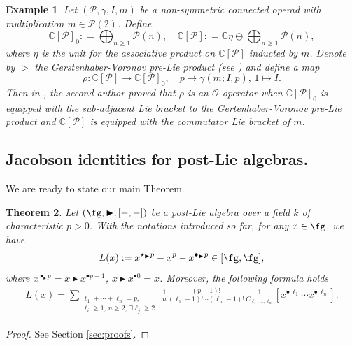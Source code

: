 \documentclass[12pt]{article}
\newcommand{\btr}{\blacktriangleright}
\newtheorem{theorem}{Theorem}[subsection]
\newtheorem{example}[theorem]{Example}
\begin{document}
\begin{example}
\label{sec:braces}
Let $(\mathcal{P},\gamma,I,m)$ be a non-symmetric connected operad with multiplication $m \in \mathcal{P}(2)$. Define 
$$
\mathbb{C}[\mathcal{P}]_0 : = \bigoplus_{n\geq 1} \mathcal{P}(n),\quad \mathbb{C}[\mathcal{P}] : = \mathbb{C}\eta \oplus \bigoplus_{n\geq 1} \mathcal{P}(n),
$$ where $\eta$ is the unit for the associative product on $\mathbb{C}[\mathcal{P}]$ inducted by $m$.
Denote by $\vartriangleright$ the Gerstenhaber-Voronov pre-Lie product (see \cite[Example 3.5.1]{G}) and define a map 
$$
\rho \colon \mathbb{C}[\mathcal{P}] \rightarrow \mathbb{C}[\mathcal{P}]_0,\quad p \mapsto \gamma(m;I,p), \, 1\mapsto I.
$$
Then in \cite[Proposition 3.5.1]{G}, the second author proved that $\rho$ is an $\mathcal{O}$-operator when $\mathbb{C}[\mathcal{P}]_0$ is equipped with the sub-adjacent Lie bracket to the Gertenhaber-Voronov pre-Lie product and $\mathbb{C}[\mathcal{P}]$ is equipped with the commutator Lie bracket of $m$.
\end{example}
\subsection{Jacobson identities for post-Lie algebras.}
\label{sec:jacobson}
 We are ready to state our main Theorem.
\begin{theorem} 
\label{thm:main} 
Let $(\fg, \btr, [-,-])$ be a post-Lie algebra over a field $k$ of characteristic $p>0$. With the notations introduced so far, for any $x \in \fg$, we have
\begin{equation}
\label{eqn:mainstatement}
L(x) := x^{\star_{\btr}p} - x^p  - x^{\bullet_{\btr} p} \in [\fg,\fg],
\end{equation}
where $x^{\bullet_{\btr} p} = x\btr x^{\bullet p-1}$, $x\btr x^{\bullet 0}=x$. Moreover, the following formula holds 
\begin{align}
L(x) = \sum_{\substack{\ell_1 + \cdots + \ell_{n} = p, \\ \ell_i \geq 1,\, n\geq 2,\,\exists \ell_j \geq 2.}} \frac{1}{n}\frac{(p-1)!}{(\ell_1-1)!\cdots (\ell_n-1)!}\frac{1}{C_{\ell_1,\ldots,\ell_n}}[x^{\bullet \,\ell_1} \cdots x^{\bullet \,\ell_{n}}].
\end{align}
\end{theorem}

\begin{proof}
 See Section \ref{sec:proofs}.
\end{proof}
\end{document}
